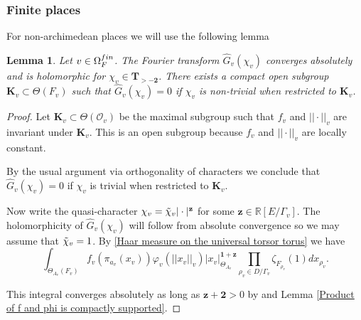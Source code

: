 \documentclass[a4paper,11pt,reqno]{amsart}
\newcommand{\R}{\mathbb{R}}
\newtheorem{lemma}[theorem]{Lemma}
\theoremstyle{definition}
\begin{document}
\subsubsection{Finite places}
For non-archimedean places we will use the following lemma
\begin{lemma}\label{lem:Fourier transform at places of bad reduction}
	Let $v \in \Omega_{F}^{\emph{fin}}$. The Fourier transform $\hat{G}_v(\chi_v)$ converges absolutely and is holomorphic for $\chi_v \in \mathbf{T}_{> - \mathbf{2}}$. There exists a compact open subgroup $\mathbf{K}_v \subset \Theta(F_v)$ such that $\hat{G}_v(\chi_v) = 0$ if $\chi_v$ is non-trivial when restricted to $\mathbf{K}_v$.
\end{lemma}
\begin{proof}
	Let $\mathbf{K}_v \subset \Theta(\mathcal{O}_v)$ be the maximal subgroup such that $f_v$ and $||\cdot||_v$ are invariant under $\mathbf{K}_v $. This is an open subgroup because $f_v$ and $||\cdot||_v$ are locally constant.
	
	By the usual argument via orthogonality of characters we conclude that $\hat{G}_v(\chi_v) = 0$ if $\chi_v$ is trivial when restricted to $\mathbf{K}_v$.
	
	Now write the quasi-character $\chi_v = \Tilde{\chi}_v | \cdot |^{\mathbf{z}}$ for some $\mathbf{z} \in \R[E/ \Gamma_v]$. The holomorphicity of $\hat{G}_v(\chi_v)$ will follow from absolute convergence so we may assume that $\Tilde{\chi}_v = 1$. By \eqref{Haar measure on the universal torsor torus} we have
	\begin{equation*}
		\int_{\Theta_{A_v}(F_v)} f_v(\pi_{a_v}(x_v)) \varphi_v(||x_v||_v) |x_v|^{\mathbf{1} + \mathbf{z}}_{\Theta_{A_v}} \prod_{\rho_v \in D / \Gamma_v} \zeta_{F_{\rho_v}}(1) dx_{\rho_v}.
	\end{equation*}

	This integral converges absolutely as long as $\mathbf{z} + \mathbf{2} > 0$ by \cite[Prop.~3.4]{Chambert-Loir2010Igusa} and Lemma \ref{Product of f and phi is compactly supported}.
\end{proof}
\end{document}
